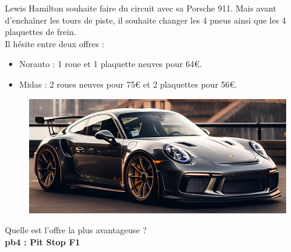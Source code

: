 \begin{multicols}{2} 
  Lewis Hamilton souhaite faire du circuit avec sa Porsche 911. Mais avant d'enchaîner les tours de piste, il souhaite changer les 4 pneus ainsi que les 4 plaquettes de frein. \\

  Il hésite entre deux offres : 

  \begin{itemize}[label={$\bullet$}]
    \item Norauto : 1 roue et 1 plaquette neuves pour 64€.
    \item Midas : 2 roues neuves pour 75€ et 2 plaquettes pour 56€. 
  \end{itemize} \columnbreak

  \begin{figure}[H]
    \centering
    \includegraphics[width=0.9\linewidth]{5x2-inegalite-triangulaire/porsche.png}
  \end{figure} 
\end{multicols}

Quelle est l'offre la plus avantageuse ?\\

\textbf{pb4 : Pit Stop F1} \\

